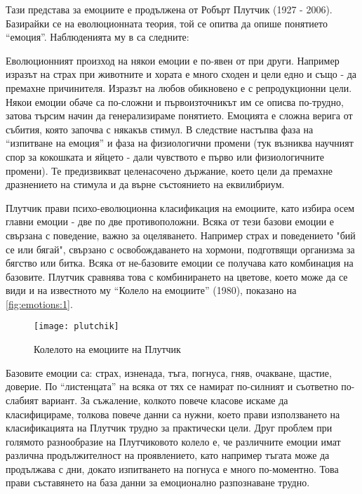 \documentclass[main.tex]{subfiles}
\begin{document}
Тази представа за емоциите е продължена от Робърт Плутчик (1927 - 2006). Базирайки се на еволюционната теория, той се опитва да опише понятието ``емоция''. Наблюденията му в \cite{plut} са следните:

Еволюционният произход на някои емоции е по-явен от при други. Например изразът на страх при животните и хората е много сходен и цели едно и също - да премахне причинителя. Изразът на любов обикновено е с репродукционни цели. Някои емоции обаче са по-сложни и първоизточникът им се описва по-трудно, затова търсим начин да генерализираме понятието. Емоцията е сложна верига от събития, която започва с някакъв стимул. В следствие настъпва фаза на ``изпитване на емоция'' и фаза на физиологични промени (тук възниква научният спор за кокошката и яйцето - дали чувството е първо или физиологичните промени). Те предизвикват целенасочено държание, което цели да премахне дразнението на стимула и да върне състоянието на еквилибриум. 

Плутчик прави психо-еволюционна класификация на емоциите, като избира осем главни емоции - две по две противоположни. Всяка от тези базови емоции е свързана с поведение, важно за оцеляването. Например страх и поведението "бий се или бягай", свързано с освобождаването на хормони, подготвящи организма за бягство или битка. Всяка от не-базовите емоции се получава като комбинация на базовите. Плутчик сравнява това с комбинирането на цветове, което може да се види и на известното му ``Колело на емоциите'' (1980), показано на \autoref{fig:emotions:1}.

\begin{minipage}{0.45\textwidth}
    \begin{figure}[H]%
        \texttt{[image: plutchik]}
        \caption{Колелото на емоциите на Плутчик}
        \label{fig:emotions:1}
    \end{figure}
\end{minipage} \hfill
\begin{minipage}{0.45\textwidth}
    Базовите емоции са: страх, изненада, тъга, погнуса, гняв, очакване, щастие, доверие. По ``листенцата'' на всяка от тях се намират по-силният и съответно по-слабият вариант. За съжаление, колкото повече класове искаме да класифицираме, толкова повече данни са нужни, което прави използването на класификацията на Плутчик трудно за практически цели. Друг проблем при голямото разнообразие на Плутчиковото колело е, че различните емоции имат различна продължителност на проявлението, като например тъгата може да продължава с дни, докато изпитването на погнуса е много по-моментно. Това прави съставянето на база данни за емоционално разпознаване трудно.
\end{minipage}
\end{document}
